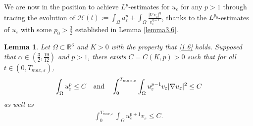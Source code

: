 \documentclass[12pt]{article}
\theoremstyle{plain}
\newtheorem{lemma}{Lemma}[section]
\theoremstyle{definition}
\numberwithin{equation}{section}
\begin{document}
We are now  in the position to achieve $L^p$-estimates for $u_{\varepsilon}$ for any $p>1$
 through tracing the evolution of $ \mathcal{ H}(t):=
 \int_{\Omega}u_{\varepsilon}^{p}+\int_{\Omega}\frac{|\nabla
   v_{\varepsilon}|^q}{v_{\varepsilon}^{q-1}}$,  thanks to the $L^{p_0}$-estimates of $u_{\varepsilon}$ with some $p_0>\frac{3}{2}$ established in Lemma \ref{lemma3.6}.
\begin{lemma}\label{lemma3.8}
Let $\Omega \subset \mathbb R^3$ and $K>0$ with the property that \eqref{1.6} holds. Supposed that
$\alpha\in\left(\frac{3}{2},\frac{19}{12}\right)$  and $p>1$, there exists  $C=C( K, p)>0$ such that for all
 $ t\in (0,T_{max,\varepsilon})$,
\begin{align}\label{3.30}
   \int_{\Omega}u_{\varepsilon}^{p}\leq C\quad \hbox{and}\quad
   \int_0^{T_{max,\varepsilon}}\int_{\Omega}u_{\varepsilon}^{p-1}v_{\varepsilon}|\nabla u_{\varepsilon}|^2\leq C
\end{align}
as well as
\begin{align}\label{3.30-1}
   \int_0^{T_{max,\varepsilon}}\int_{\Omega}u_{\varepsilon}^{p+1}v_{\varepsilon}\leq C.
\end{align}
\end{lemma}
\end{document}

